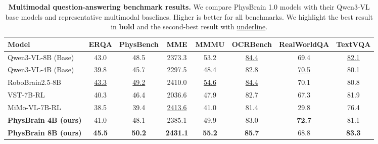 \begin{table}[t]
  \centering
  \small
  \setlength{\tabcolsep}{4.5pt}
  \renewcommand{\arraystretch}{1.15}
  \caption{
    \textbf{Multimodal question-answering benchmark results.}
    We compare PhysBrain 1.0 models with their Qwen3-VL base models and representative multimodal baselines.
    Higher is better for all benchmarks. We highlight the best result in \textbf{bold} and the second-best result with \underline{underline}.
  }
  \begin{adjustbox}{width=\textwidth}
  \begin{tabular}{l c c c c c c c}
    \toprule
    \textbf{Model} & \textbf{ERQA} & \textbf{PhysBench} & \textbf{MME} & \textbf{MMMU} & \textbf{OCRBench} & \textbf{RealWorldQA} & \textbf{TextVQA} \\
    \midrule
    Qwen3-VL-8B (Base) & 43.0 & 48.5 & 2373.3 & 53.2 & \underline{84.4} & 69.4 & \underline{82.1} \\
    Qwen3-VL-4B (Base) & 39.8 & 45.7 & 2297.5 & 48.4 & 82.8 & \underline{70.5} & 80.1 \\
    RoboBrain2.5-8B & \underline{43.3} & \underline{49.2} & 2410.0 & \underline{54.6} & \underline{84.4} & 70.1 & 80.8 \\
    VST-7B-RL & 40.3 & 46.4 & 2036.6 & 47.9 & 82.7 & 67.3 & 81.9 \\
    MiMo-VL-7B-RL & 38.5 & 39.4 & \underline{2413.6} & 41.0 & 81.4 & 29.8 & 76.4 \\
    \textbf{PhysBrain 4B (ours)} & 41.0 & 48.1 & 2385.1 & 49.9 & 83.0 & \textbf{72.7} & 81.1 \\
    \textbf{PhysBrain 8B (ours)} & \textbf{45.5} & \textbf{50.2} & \textbf{2431.1} & \textbf{55.2} & \textbf{85.7} & 68.8 & \textbf{83.3} \\
    \bottomrule
  \end{tabular}
  \end{adjustbox}
  \label{tab:vlm_qa_results}
\end{table}
